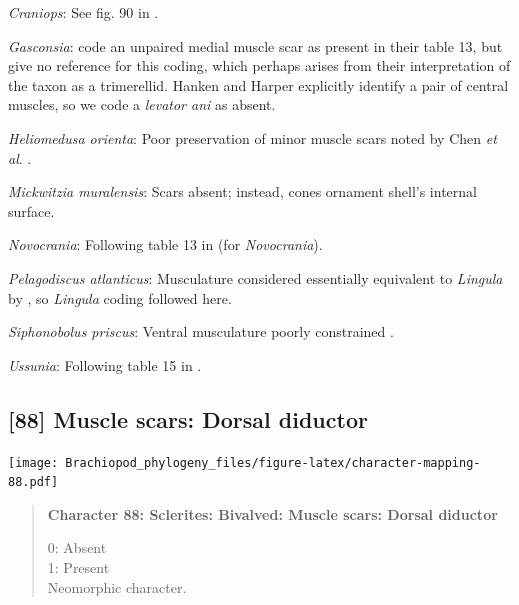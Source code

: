 \documentclass[openany]{book}
\begin{document}
\hypertarget{Craniops-coding-87}{}
\emph{Craniops}: See fig. 90 in
\citet{Williams2000LinguliformeaCraniiformea}.

\hypertarget{Gasconsia-coding-87}{}
\emph{Gasconsia}: \citet{Williams2000LinguliformeaCraniiformea} code an
unpaired medial muscle scar as present in their table 13, but give no
reference for this coding, which perhaps arises from their
interpretation of the taxon as a trimerellid. Hanken and Harper
\citeyearpar[p.~249 and text-fig. 2]{Hanken1985Thetaxonomy} explicitly
identify a pair of central muscles, so we code a \emph{levator ani} as
absent.

\hypertarget{Heliomedusa_orienta-coding-87}{}
\emph{Heliomedusa orienta}: Poor preservation of minor muscle scars
noted by Chen \emph{et al}. \citeyearpar{Chen2007Reinterpretationof}.

\hypertarget{Mickwitzia_muralensis-coding-87}{}
\emph{Mickwitzia muralensis}: Scars absent; instead, cones ornament
shell's internal surface.

\hypertarget{Novocrania-coding-87}{}
\emph{Novocrania}: Following table 13 in
\citet{Williams2000LinguliformeaCraniiformea} (for \emph{Novocrania}).

\hypertarget{Pelagodiscus_atlanticus-coding-87}{}
\emph{Pelagodiscus atlanticus}: Musculature considered essentially
equivalent to \emph{Lingula} by
\citet{Williams2000LinguliformeaCraniiformea}, so \emph{Lingula} coding
followed here.

\hypertarget{Siphonobolus_priscus-coding-87}{}
\emph{Siphonobolus priscus}: Ventral musculature poorly constrained
\citep{Williams2000LinguliformeaCraniiformea, Popov2009Earlyontogeny}.

\hypertarget{Ussunia-coding-87}{}
\emph{Ussunia}: Following table 15 in
\citet{Williams2000LinguliformeaCraniiformea}.

\subsection*{{[}88{]} Muscle scars: Dorsal
diductor}\label{muscle-scars-dorsal-diductor}

\texttt{[image: Brachiopod\_phylogeny\_files/figure-latex/character-mapping-88.pdf]}

\begin{quote}
\textbf{Character 88: Sclerites: Bivalved: Muscle scars: Dorsal
diductor}

0: Absent\\
1: Present\\
Neomorphic character.
\end{quote}
\end{document}
